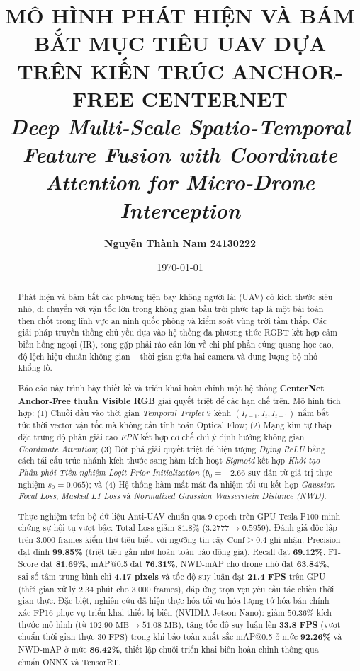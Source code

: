 \documentclass[11pt,a4paper]{article}
\title{\textbf{MÔ HÌNH PHÁT HIỆN VÀ BÁM BẮT MỤC TIÊU UAV DỰA TRÊN KIẾN TRÚC ANCHOR-FREE CENTERNET}\\
\large{\textit{Deep Multi-Scale Spatio-Temporal Feature Fusion with Coordinate Attention for Micro-Drone Interception}}}
\author{\textbf{Nguyễn Thành Nam 24130222}}
\date{\today}
\begin{document}
\maketitle

\begin{abstract}
Phát hiện và bám bắt các phương tiện bay không người lái (UAV) có kích thước siêu nhỏ, di chuyển với vận tốc lớn trong không gian bầu trời phức tạp là một bài toán then chốt trong lĩnh vực an ninh quốc phòng và kiểm soát vùng trời tầm thấp. Các giải pháp truyền thống chủ yếu dựa vào hệ thống đa phương thức RGBT kết hợp cảm biến hồng ngoại (IR), song gặp phải rào cản lớn về chi phí phần cứng quang học cao, độ lệch hiệu chuẩn không gian -- thời gian giữa hai camera và dung lượng bộ nhớ khổng lồ. 

Báo cáo này trình bày thiết kế và triển khai hoàn chỉnh một hệ thống \textbf{CenterNet Anchor-Free thuần Visible RGB} giải quyết triệt để các hạn chế trên. Mô hình tích hợp: 
(1) Chuỗi đầu vào thời gian \textit{Temporal Triplet} 9 kênh $(I_{t-1}, I_t, I_{t+1})$ nắm bắt tức thời vector vận tốc mà không cần tính toán Optical Flow; 
(2) Mạng kim tự tháp đặc trưng độ phân giải cao \textit{FPN} kết hợp cơ chế chú ý định hướng không gian \textit{Coordinate Attention}; 
(3) Đột phá giải quyết triệt để hiện tượng \textit{Dying ReLU} bằng cách tái cấu trúc nhánh kích thước sang hàm kích hoạt \textit{Sigmoid} kết hợp \textit{Khởi tạo Phân phối Tiền nghiệm Logit Prior Initialization} ($b_0 = -2.66$ suy dẫn từ giá trị thực nghiệm $s_0 = 0.065$); và (4) Hệ thống hàm mất mát đa nhiệm tối ưu kết hợp \textit{Gaussian Focal Loss}, \textit{Masked L1 Loss} và \textit{Normalized Gaussian Wasserstein Distance (NWD)}. 

Thực nghiệm trên bộ dữ liệu Anti-UAV chuẩn qua 9 epoch trên GPU Tesla P100 minh chứng sự hội tụ vượt bậc: Total Loss giảm $81.8\%$ ($3.2777 \rightarrow 0.5959$). Đánh giá độc lập trên 3.000 frames kiểm thử tiêu biểu với ngưỡng tin cậy $\text{Conf} \ge 0.4$ ghi nhận: Precision đạt đỉnh \textbf{99.85\%} (triệt tiêu gần như hoàn toàn báo động giả), Recall đạt \textbf{69.12\%}, F1-Score đạt \textbf{81.69\%}, mAP@0.5 đạt \textbf{76.31\%}, NWD-mAP cho drone nhỏ đạt \textbf{63.84\%}, sai số tâm trung bình chỉ \textbf{4.17 pixels} và tốc độ suy luận đạt \textbf{21.4 FPS} trên GPU (thời gian xử lý 2.34 phút cho 3.000 frames), đáp ứng trọn vẹn yêu cầu tác chiến thời gian thực. Đặc biệt, nghiên cứu đã hiện thực hóa tối ưu hóa lượng tử hóa bán chính xác FP16 phục vụ triển khai thiết bị biên (NVIDIA Jetson Nano): giảm $50.36\%$ kích thước mô hình (từ $102.90\text{ MB} \rightarrow 51.08\text{ MB}$), tăng tốc độ suy luận lên \textbf{33.8 FPS} (vượt chuẩn thời gian thực $30\text{ FPS}$) trong khi bảo toàn xuất sắc mAP@0.5 ở mức \textbf{92.26\%} và NWD-mAP ở mức \textbf{86.42\%}, thiết lập chuỗi triển khai biên hoàn chỉnh thông qua chuẩn ONNX và TensorRT.
\end{abstract}
\end{document}
